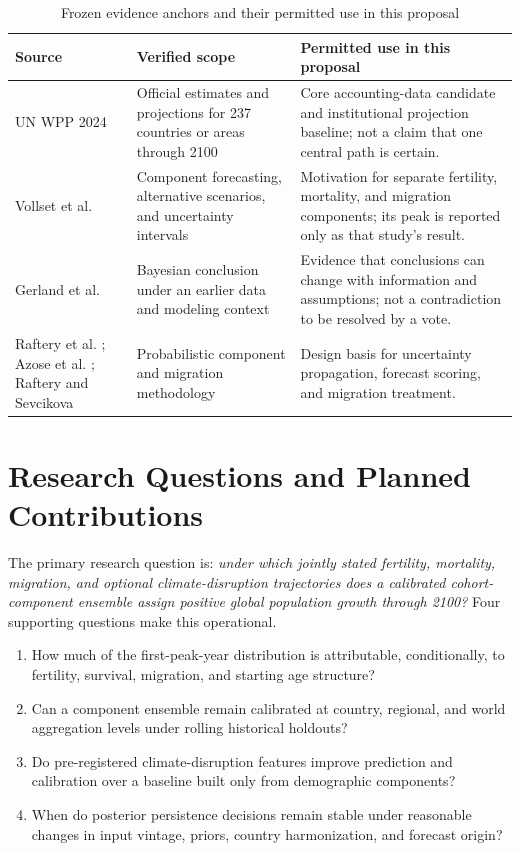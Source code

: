 \documentclass[conference]{IEEEtran}
\begin{document}
\begin{table}[t]
\caption{Frozen evidence anchors and their permitted use in this proposal}
\label{tab:evidence}
\centering
\footnotesize
\begin{tabular}{p{}p{}p{}}
\toprule
Source & Verified scope & Permitted use in this proposal \\
\midrule
UN WPP 2024 \cite{unwpp2024} & Official estimates and projections for 237 countries or areas through 2100 & Core accounting-data candidate and institutional projection baseline; not a claim that one central path is certain. \\
Vollset et al. \cite{vollset2020} & Component forecasting, alternative scenarios, and uncertainty intervals & Motivation for separate fertility, mortality, and migration components; its peak is reported only as that study's result. \\
Gerland et al. \cite{gerland2014} & Bayesian conclusion under an earlier data and modeling context & Evidence that conclusions can change with information and assumptions; not a contradiction to be resolved by a vote. \\
Raftery et al. \cite{raftery2014}; Azose et al. \cite{azose2016}; Raftery and Sevcikova \cite{raftery2023} & Probabilistic component and migration methodology & Design basis for uncertainty propagation, forecast scoring, and migration treatment. \\
\bottomrule
\end{tabular}
\end{table}

\section{Research Questions and Planned Contributions}

The primary research question is: \emph{under which jointly stated fertility, mortality, migration, and optional climate-disruption trajectories does a calibrated cohort-component ensemble assign positive global population growth through 2100?} Four supporting questions make this operational.

\begin{enumerate}
\item How much of the first-peak-year distribution is attributable, conditionally, to fertility, survival, migration, and starting age structure?
\item Can a component ensemble remain calibrated at country, regional, and world aggregation levels under rolling historical holdouts?
\item Do pre-registered climate-disruption features improve prediction and calibration over a baseline built only from demographic components?
\item When do posterior persistence decisions remain stable under reasonable changes in input vintage, priors, country harmonization, and forecast origin?
\end{enumerate}
\end{document}
